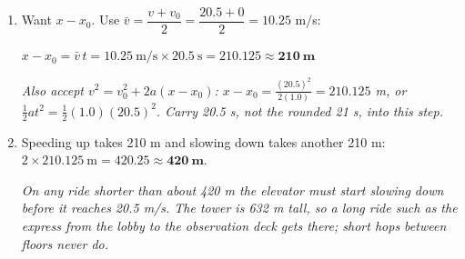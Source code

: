 \documentclass[12pt, twoside]{article}
\begin{document}
\begin{enumerate}[itemsep=0.5cm]
\begin{enumerate}[itemsep=0.3cm]
      $t = \dfrac{20.5~\text{m/s} - 0}{1.0~\text{m/s}^2} = 20.5
      \approx \mathbf{21~\textbf{s}}$

      \emph{Accept 20.5 s. The acceleration has two significant figures, so 21 s is
      the strict answer; either earns the mark.}
    \item Want $x - x_0$. Use $\bar{v} = \dfrac{v + v_0}{2} = \dfrac{20.5 + 0}{2}
      = 10.25$ m/s:

      $x - x_0 = \bar{v}\,t = 10.25~\text{m/s} \times 20.5~\text{s} = 210.125
      \approx \mathbf{210~\textbf{m}}$

      \emph{Also accept $v^2 = v_0^2 + 2a(x - x_0)$:
      $x - x_0 = \frac{(20.5)^2}{2(1.0)} = 210.125$ m, or
      $\frac{1}{2}at^2 = \frac{1}{2}(1.0)(20.5)^2$. Carry 20.5 s, not the rounded
      21 s, into this step.}
    \item Speeding up takes 210 m and slowing down takes another 210 m:
      $2 \times 210.125~\text{m} = 420.25 \approx \mathbf{420~\textbf{m}}$.

      \emph{On any ride shorter than about 420 m the elevator must start slowing down
      before it reaches 20.5 m/s. The tower is 632 m tall, so a long ride such as
      the express from the lobby to the observation deck gets there; short hops
      between floors never do.}
  \end{enumerate}

\end{enumerate}
\end{document}
